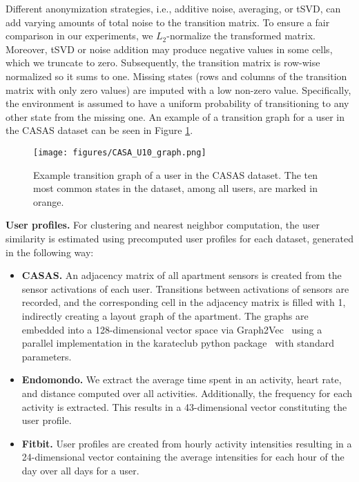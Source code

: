 \documentclass{article}
\begin{document}
Different anonymization strategies, i.e., additive noise, averaging, or tSVD, can add varying amounts of total noise to the transition matrix. To ensure a fair comparison in our experiments, we $L_2$-normalize the transformed matrix. Moreover, tSVD or noise addition may produce negative values in some cells, which we truncate to zero. %
Subsequently, the transition matrix is row-wise normalized so it sums to one.  Missing states (rows and columns of the transition matrix with only zero values) are imputed with a low non-zero value. Specifically, the environment is assumed to have a uniform probability of transitioning to any other state from the missing one. An example of a transition graph for a user in the CASAS dataset can be seen in Figure \ref{fig:trans_graph_casa}.

\begin{figure}
    \centering
    \texttt{[image: figures/CASA\_U10\_graph.png]}
    \caption{Example transition graph of a user in the CASAS dataset. The ten most common states in the dataset, among all users, are marked in orange.}
    \label{fig:trans_graph_casa}
\end{figure}

\textbf{User profiles.} For clustering and nearest neighbor computation, the user similarity is estimated using precomputed user profiles for each dataset, generated in the following way:

\begin{itemize}%
    \item \textbf{CASAS.} An adjacency matrix of all apartment sensors is created from the sensor activations of each user. Transitions between activations of sensors are recorded, and the corresponding cell in the adjacency matrix is filled with 1, indirectly creating a layout graph of the apartment. The graphs are embedded into a 128-dimensional vector space via Graph2Vec~\citep{narayanan2017} using a parallel implementation in the karateclub python package~\citep{karateclub} with standard parameters.
    \item \textbf{Endomondo.} We extract the average time spent in an activity, heart rate, and distance computed over all activities. Additionally, the frequency for each activity is extracted. This results in a  43-dimensional vector constituting the user profile.
    \item \textbf{Fitbit.} User profiles are created from hourly activity intensities resulting in a 24-dimensional vector containing the average intensities for each hour of the day over all days for a user.
\end{itemize}
\end{document}
